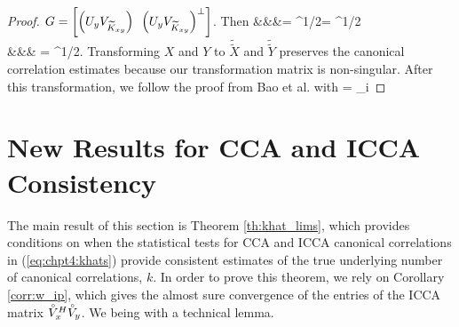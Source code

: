 \begin{proof}
$G=\left[\left(U_y V_{\widetilde{K}_{xy}}\right)\,\,\,\left(U_y V_{\widetilde{K}_{xy}}\right)^{\perp}\right]$. Then
\be\ba
& &&=
\left[\begin{array}{cc}F^H & 0 \\ 0 &
    G^H\end{array}\right]^{1/2} =  \left[\begin{array}{cc}F^HR_{yy}^{-1/2} & 0 \\ 0 &
    G^HR_{yy}^{-1/2}\end{array}\right]^{1/2}\left[\begin{array}{c} X \\
    Y \end{array}\right]\\
&&& = \left[\begin{array}{cc}I_p & K \\ K^H &
    I_q\end{array}\right]^{1/2}\left[\begin{array}{c}W_1 \\ W_2\end{array}\right].
\ea\ee
Transforming $X$ and $Y$ to $\widetilde{\widetilde{X}}$ and
$\widetilde{\widetilde{Y}}$ preserves the canonical correlation estimates because our
transformation matrix is non-singular. After this transformation, we follow the proof from
Bao et al. \cite{bao2014canonical} with
\be
{} = \kappa_i
\ee
\end{proof}

\section{New Results for CCA and ICCA Consistency}\label{sec:chpt4:new_results}

The main result of this section is Theorem \ref{th:khat_lims}, which provides conditions
on when the statistical tests for CCA and ICCA canonical correlations in
(\ref{eq:chpt4:khats}) provide consistent estimates of the true underlying number of
canonical correlations, $k$. In order to prove this theorem, we rely on Corollary
\ref{corr:w_ip}, which gives the almost sure convergence of the entries of the ICCA matrix
$\accentset{\circ}{V}_x^H\accentset{\circ}{V}_y$. We being with a technical lemma.

